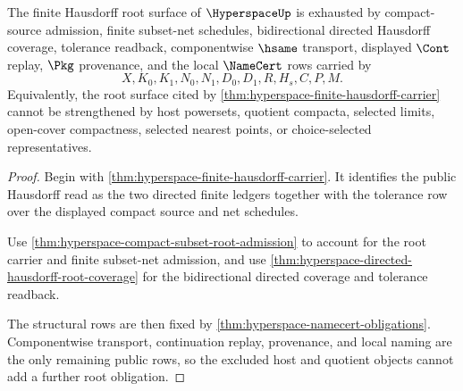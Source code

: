 \begin{theorem}
\label{thm:hyperspace-finite-hausdorff-root-obligations}
The finite Hausdorff root surface of $\HyperspaceUp$ is exhausted by compact-source admission, finite subset-net schedules, bidirectional directed Hausdorff coverage, tolerance readback, componentwise $\hsame$ transport, displayed $\Cont$ replay, $\Pkg$ provenance, and the local $\NameCert$ rows carried by
$$
X,K_0,K_1,N_0,N_1,D_0,D_1,R,H_s,C,P,M .
$$
Equivalently, the root surface cited by \autoref{thm:hyperspace-finite-hausdorff-carrier} cannot be strengthened by host powersets, quotient compacta, selected limits, open-cover compactness, selected nearest points, or choice-selected representatives.
\end{theorem}
\begin{proof}
Begin with \autoref{thm:hyperspace-finite-hausdorff-carrier}. It identifies the public Hausdorff read as the two directed finite ledgers together with the tolerance row over the displayed compact source and net schedules.

Use \autoref{thm:hyperspace-compact-subset-root-admission} to account for the root carrier and finite subset-net admission, and use \autoref{thm:hyperspace-directed-hausdorff-root-coverage} for the bidirectional directed coverage and tolerance readback.

The structural rows are then fixed by \autoref{thm:hyperspace-namecert-obligations}. Componentwise transport, continuation replay, provenance, and local naming are the only remaining public rows, so the excluded host and quotient objects cannot add a further root obligation.
\end{proof}

